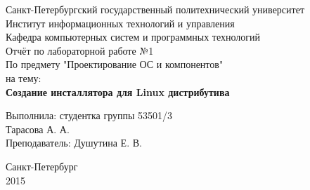 \thispagestyle{empty}
\begin{center}
\large Санкт-Петербургский государственный политехнический университет\\
Институт информационных технологий и управления\\
Кафедра компьютерных систем и программных технологий\\
\vspace{65mm}
\Large Отчёт по лабораторной работе №1\\ По предмету "Проектирование ОС и компонентов" \\на тему:\\
\LARGE\textbf{Создание инсталлятора для Linux дистрибутива}
\end{center}

\vspace{40mm}
\begin{flushright}
\large Выполнила: студентка группы 53501/3\\ Тарасова А. А.\\ Преподаватель: Душутина Е. В.
\end{flushright}
\vspace{30mm}

\begin{center}
Санкт-Петербург\\ 2015
\end{center}